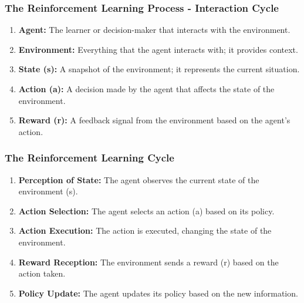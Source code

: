 \documentclass[aspectratio=169]{beamer}
\begin{document}
\begin{frame}[fragile]
    \frametitle{The Reinforcement Learning Process - Interaction Cycle}
    
    \begin{enumerate}
        \item \textbf{Agent:} The learner or decision-maker that interacts with the environment.
        \item \textbf{Environment:} Everything that the agent interacts with; it provides context.
        \item \textbf{State (s):} A snapshot of the environment; it represents the current situation.
        \item \textbf{Action (a):} A decision made by the agent that affects the state of the environment.
        \item \textbf{Reward (r):} A feedback signal from the environment based on the agent's action.
    \end{enumerate}
\end{frame}

\begin{frame}[fragile]
    \frametitle{The Reinforcement Learning Cycle}
    
    \begin{enumerate}
        \item \textbf{Perception of State:} The agent observes the current state of the environment (s).
        \item \textbf{Action Selection:} The agent selects an action (a) based on its policy.
        \item \textbf{Action Execution:} The action is executed, changing the state of the environment.
        \item \textbf{Reward Reception:} The environment sends a reward (r) based on the action taken.
        \item \textbf{Policy Update:} The agent updates its policy based on the new information.
    \end{enumerate}
\end{frame}
\end{document}
